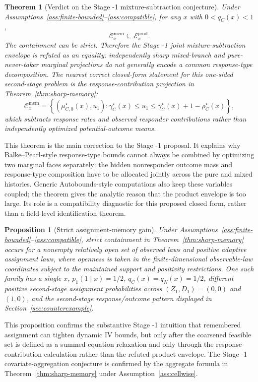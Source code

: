\documentclass[11pt]{article}
\theoremstyle{definition}
\theoremstyle{plain}
\newtheorem{theorem}{Theorem}
\newtheorem{proposition}{Proposition}
\theoremstyle{remark}
\begin{document}
\begin{theorem}[Verdict on the Stage -1 mixture-subtraction conjecture]\label{thm:product-fails}
Under Assumptions~\ref{ass:finite-bounded}--\ref{ass:compatible}, for any \(x\) with \(0<q_C(x)<1\),
\[
\mathcal C_x^{\mathrm{mem}}\subseteq \mathcal E_x^{\mathrm{prod}}.
\]
The containment can be strict.  Therefore the Stage -1 joint mixture-subtraction envelope is refuted as an equality: independently sharp mixed-branch and pure-never-taker marginal projections do not generally encode a common response-type decomposition.  The nearest correct closed-form statement for this one-sided second-stage problem is the response-contribution projection in Theorem~\ref{thm:sharp-memory}:
\[
\mathcal C_x^{\mathrm{mem}}
=
\left\{
\left(\mu_{C,0}^{\star}(x),u_1\right):
\gamma_C^{\star}(x)\le u_1\le
\gamma_C^{\star}(x)+1-\rho_C^{\star}(x)
\right\},
\]
which subtracts response rates and observed responder contributions rather than independently optimized potential-outcome means.
\end{theorem}

This theorem is the main correction to the Stage -1 proposal.  It explains why Balke--Pearl-style response-type bounds cannot always be combined by optimizing two marginal faces separately: the hidden nonresponder outcome mass and response-type composition have to be allocated jointly across the pure and mixed histories.  Generic Autobounds-style computations also keep these variables coupled; the theorem gives the analytic reason that the product envelope is too large.  Its role is a compatibility diagnostic for this proposed closed form, rather than a field-level identification theorem.

\begin{proposition}[Strict assignment-memory gain]\label{prop:strict-aggregation}
Under Assumptions~\ref{ass:finite-bounded}--\ref{ass:compatible}, strict containment in Theorem~\ref{thm:sharp-memory} occurs for a nonempty relatively open set of observed laws and positive adaptive assignment laws, where openness is taken in the finite-dimensional observable-law coordinates subject to the maintained support and positivity restrictions.  One such family has a single \(x\), \(p_1(1\mid x)=1/2\), \(q_C(x)=q_N(x)=1/2\), different positive second-stage assignment probabilities across \((Z_1,D_1)=(0,0)\) and \((1,0)\), and the second-stage response/outcome pattern displayed in Section~\ref{sec:counterexample}.
\end{proposition}

This proposition confirms the substantive Stage -1 intuition that remembered assignment can tighten dynamic IV bounds, but only after the coarsened feasible set is defined as a summed-equation relaxation and only through the response-contribution calculation rather than the refuted product envelope.  The Stage -1 covariate-aggregation conjecture is confirmed by the aggregate formula in Theorem~\ref{thm:sharp-memory} under Assumption~\ref{ass:cellwise}.
\end{document}
